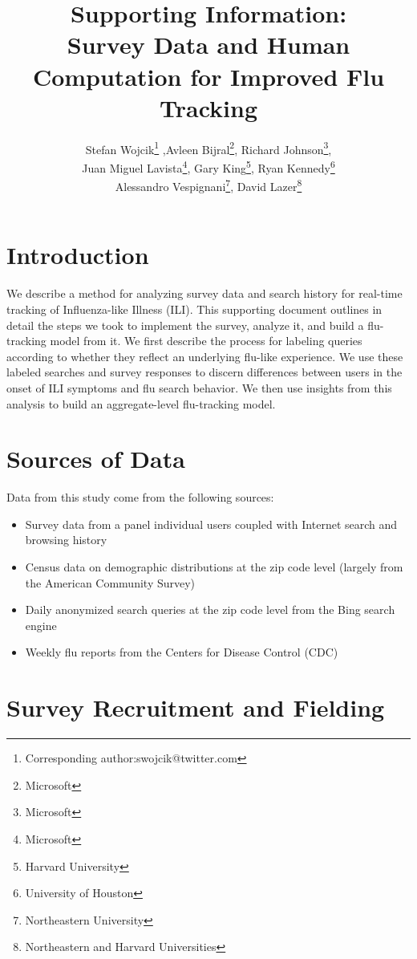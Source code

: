 \documentclass[12pt]{article}
\title{Supporting Information: \\ Survey Data and Human Computation for Improved Flu Tracking}
\author{Stefan Wojcik\footnote{Corresponding author:swojcik@twitter.com}
,Avleen Bijral\footnote{Microsoft},
Richard Johnson\footnote{Microsoft},\\
Juan Miguel Lavista\footnote{Microsoft},
Gary King\footnote{Harvard University},
Ryan Kennedy\footnote{University of Houston}\\
Alessandro Vespignani\footnote{Northeastern University},
David Lazer\footnote{Northeastern and Harvard Universities}}
\begin{document}
\maketitle

\clearpage

\tableofcontents

\clearpage

\singlespacing

\newpage

\section{Introduction}

We describe a method for analyzing survey data and search history for real-time tracking of Influenza-like Illness (ILI). This supporting document outlines in detail the steps we took to implement the survey, analyze it, and build a flu-tracking model from it. We first describe the process for labeling queries according to whether they reflect an underlying flu-like experience. We use these labeled searches and survey responses to discern differences between users in the onset of ILI symptoms and flu search behavior. We then use insights from this analysis to build an aggregate-level flu-tracking model.

\section{Sources of Data}
Data from this study come from the following sources:
\begin{itemize}
\item Survey data from a panel individual users coupled with Internet search and browsing history
\item Census data on demographic distributions at the zip code level (largely from the American Community Survey)
\item Daily anonymized search queries at the zip code level from the Bing search engine
\item Weekly flu reports from the Centers for Disease Control (CDC)
\end{itemize}

\section{Survey Recruitment and Fielding}
\end{document}
